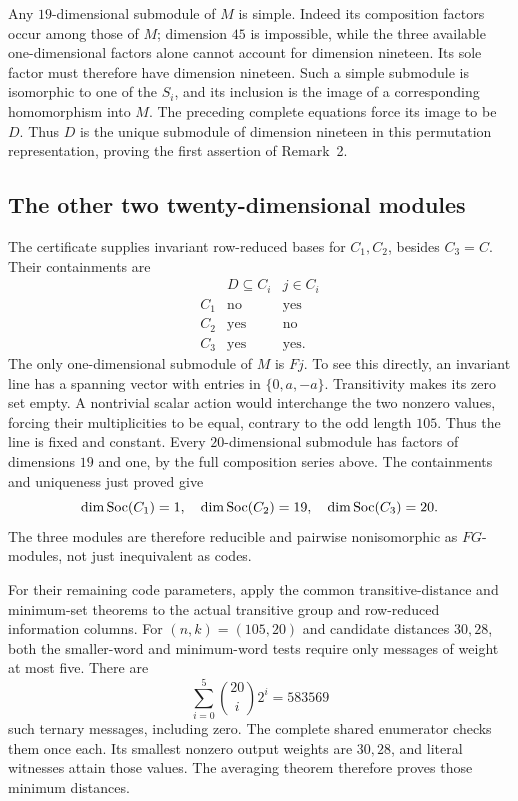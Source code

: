 Any $19$-dimensional submodule of $M$ is simple. Indeed its composition
factors occur among those of $M$; dimension $45$ is impossible, while
the three available one-dimensional factors alone cannot account for
dimension nineteen. Its sole factor must therefore have dimension
nineteen. Such a simple submodule is isomorphic to one of the $S_i$,
and its inclusion is the image of a corresponding homomorphism into
$M$. The preceding complete equations force its image to be $D$.
Thus $D$ is the unique submodule of dimension nineteen in this
permutation representation, proving the first assertion of Remark~2.

\subsection{The other two twenty-dimensional modules}
The certificate supplies invariant row-reduced bases for $C_1,C_2$,
besides $C_3=C$. Their containments are
\[
\begin{array}{c|cc}
 &D\subseteq C_i&j\in C_i\\\hline
C_1&\text{no}&\text{yes}\\
C_2&\text{yes}&\text{no}\\
C_3&\text{yes}&\text{yes}.
\end{array}
\]
The only one-dimensional submodule of $M$ is $Fj$. To see this directly,
an invariant line has a spanning vector with entries in $\{0,a,-a\}$.
Transitivity makes its zero set empty. A nontrivial scalar action would
interchange the two nonzero values, forcing their multiplicities to be
equal, contrary to the odd length $105$. Thus the line is fixed and
constant. Every $20$-dimensional submodule has factors of dimensions
$19$ and one, by the full composition series above. The containments
and uniqueness just proved give
\[
 \dim\operatorname{Soc}(C_1)=1,\quad \dim\operatorname{Soc}(C_2)=19,\quad
 \dim\operatorname{Soc}(C_3)=20.
\]
The three modules are therefore reducible and pairwise nonisomorphic
as $FG$-modules, not just inequivalent as codes.

For their remaining code parameters, apply the common transitive-distance and minimum-set theorems \cite[Theorems~8.1--8.2]{U} to the actual transitive group and row-reduced information columns.
For $(n,k)=(105,20)$ and candidate distances $30,28$, both the smaller-word
and minimum-word tests require only messages of weight at most five.
There are
\[
 \sum_{i=0}^{5}\binom{20}{i}2^i=583569
\]
such ternary messages, including zero. The complete shared enumerator
checks them once each. Its smallest nonzero output weights are $30,28$,
and literal witnesses attain those values. The averaging theorem
therefore proves those minimum distances.

